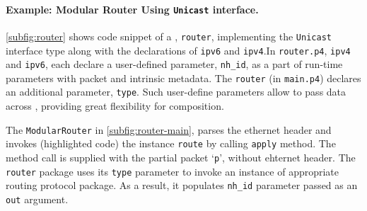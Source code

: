 \documentclass[letterpaper,twocolumn,10pt]{article}
\begin{document}

\paragraph{Example: Modular Router Using \texttt{Unicast} interface.}
\cref{subfig:router} shows code snippet of a \upackage, 
\texttt{router}, implementing the \texttt{Unicast} interface type 
along with the declarations of \upackages \texttt{ipv6} and 
\texttt{ipv4}.\footnotemark[\value{footnote}] In 
\texttt{router.p4}, \texttt{ipv4} and \texttt{ipv6}, each declare 
a user-defined parameter, \texttt{nh\_id}, as a part of run-time 
parameters with packet and intrinsic metadata. The 
\texttt{router} (in \texttt{main.p4}) declares an additional 
parameter, \texttt{type}. Such user-define parameters allow to pass 
data across \upackages, providing great flexibility for composition.

The \texttt{ModularRouter} \uprogram in 
\cref{subfig:router-main}, parses the ethernet header and invokes 
(highlighted code) the instance \texttt{route} by calling 
\texttt{apply} method. The method call is supplied with the partial 
packet `\texttt{p}', without ehternet header. The \texttt{router} 
package uses its \texttt{type} parameter to invoke an instance of 
appropriate routing protocol package. As a result, it populates 
\texttt{nh\_id} parameter passed as an \texttt{out} argument.
\end{document}
